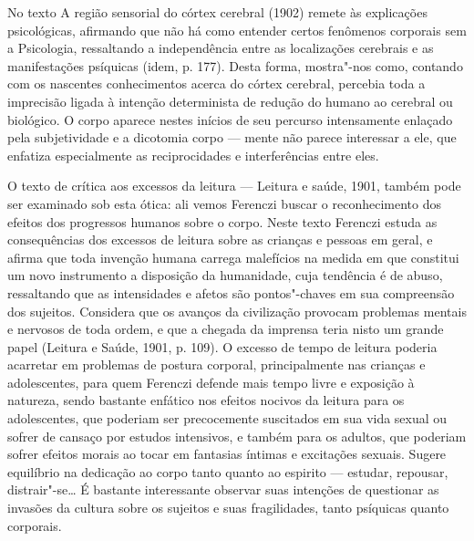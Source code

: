 No texto A região sensorial do córtex cerebral (1902) remete às
explicações psicológicas, afirmando que não há como entender certos
fenômenos corporais sem a Psicologia, ressaltando a independência entre
as localizações cerebrais e as manifestações psíquicas (idem, p. 177).
Desta forma, mostra"-nos como, contando com os nascentes conhecimentos
acerca do córtex cerebral, percebia toda a imprecisão ligada à intenção
determinista de redução do humano ao cerebral ou biológico. O corpo
aparece nestes inícios de seu percurso intensamente enlaçado pela
subjetividade e a dicotomia corpo --- mente não parece interessar a ele,
que enfatiza especialmente as reciprocidades e interferências entre
eles.

O texto de crítica aos excessos da leitura --- Leitura e saúde, 1901,
também pode ser examinado sob esta ótica: ali vemos Ferenczi buscar o
reconhecimento dos efeitos dos progressos humanos sobre o corpo. Neste
texto Ferenczi estuda as consequências dos excessos de leitura sobre as
crianças e pessoas em geral, e afirma que toda invenção humana carrega
malefícios na medida em que constitui um novo instrumento a disposição
da humanidade, cuja tendência é de abuso, ressaltando que as
intensidades e afetos são pontos"-chaves em sua compreensão dos sujeitos.
Considera que os avanços da civilização provocam problemas mentais e
nervosos de toda ordem, e que a chegada da imprensa teria nisto um
grande papel (Leitura e Saúde, 1901, p. 109). O excesso de tempo de
leitura poderia acarretar em problemas de postura corporal,
principalmente nas crianças e adolescentes, para quem Ferenczi defende
mais tempo livre e exposição à natureza, sendo bastante enfático nos
efeitos nocivos da leitura para os adolescentes, que poderiam ser
precocemente suscitados em sua vida sexual ou sofrer de cansaço por
estudos intensivos, e também para os adultos, que poderiam sofrer
efeitos morais ao tocar em fantasias íntimas e excitações sexuais.
Sugere equilíbrio na dedicação ao corpo tanto quanto ao espirito ---
estudar, repousar, distrair"-se\ldots{} É bastante interessante observar suas
intenções de questionar as invasões da cultura sobre os sujeitos e suas
fragilidades, tanto psíquicas quanto corporais.

